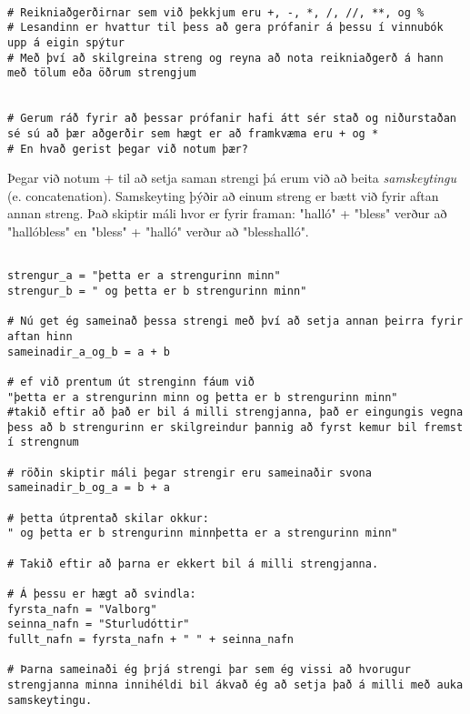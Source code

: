 
\begin{lstlisting}[caption=Strengir og reikniaðgerðir]

# Reikniaðgerðirnar sem við þekkjum eru +, -, *, /, //, **, og %
# Lesandinn er hvattur til þess að gera prófanir á þessu í vinnubók upp á eigin spýtur
# Með því að skilgreina streng og reyna að nota reikniaðgerð á hann með tölum eða öðrum strengjum


# Gerum ráð fyrir að þessar prófanir hafi átt sér stað og niðurstaðan sé sú að þær aðgerðir sem hægt er að framkvæma eru + og *
# En hvað gerist þegar við notum þær?

\end{lstlisting}


Þegar við notum + til að setja saman strengi þá erum við að beita \textit{samskeytingu} (e. concatenation).
Samskeyting þýðir að einum streng er bætt við fyrir aftan annan streng.
Það skiptir máli hvor er fyrir framan: "halló" + "bless" verður að "hallóbless" en "bless" + "halló" verður að "blesshalló".

\begin{lstlisting}[caption=Samskeyting strengja]

strengur_a = "þetta er a strengurinn minn"
strengur_b = " og þetta er b strengurinn minn"

# Nú get ég sameinað þessa strengi með því að setja annan þeirra fyrir aftan hinn
sameinadir_a_og_b = a + b

# ef við prentum út strenginn fáum við 
"þetta er a strengurinn minn og þetta er b strengurinn minn"
#takið eftir að það er bil á milli strengjanna, það er eingungis vegna þess að b strengurinn er skilgreindur þannig að fyrst kemur bil fremst í strengnum

# röðin skiptir máli þegar strengir eru sameinaðir svona
sameinadir_b_og_a = b + a

# þetta útprentað skilar okkur:
" og þetta er b strengurinn minnþetta er a strengurinn minn"

# Takið eftir að þarna er ekkert bil á milli strengjanna.

# Á þessu er hægt að svindla:
fyrsta_nafn = "Valborg"
seinna_nafn = "Sturludóttir"
fullt_nafn = fyrsta_nafn + " " + seinna_nafn

# Þarna sameinaði ég þrjá strengi þar sem ég vissi að hvorugur strengjanna minna innihéldi bil ákvað ég að setja það á milli með auka samskeytingu.
\end{lstlisting}

